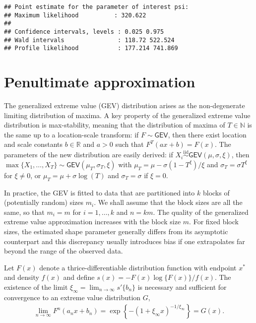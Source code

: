 \documentclass[]{book}
\begin{document}
\begin{verbatim}
## Point estimate for the parameter of interest psi:
## Maximum likelihood          : 320.622 
## 
## Confidence intervals, levels : 0.025 0.975 
## Wald intervals               : 118.72 522.524 
## Profile likelihood           : 177.214 741.869
\end{verbatim}

\hypertarget{penultimate-approximation}{%
\chapter{Penultimate approximation}\label{penultimate-approximation}}

The generalized extreme value (GEV) distribution arises as the non-degenerate limiting distribution of maxima. A key property of the generalized extreme value distribution is max-stability, meaning that the distribution of maxima of \(T \in \mathbb{N}\) is the same up to a location-scale transform: if \(F \sim \mathsf{GEV}\), then there exist location and scale constants \(b \in \mathbb{R}\) and \(a>0\) such that \(F^T(ax+b) = F(x)\). The parameters of the new distribution are easily derived: if \(X_i \stackrel{\mathrm{iid}}{\sim}\mathsf{GEV}(\mu,\sigma, \xi)\), then \(\max\{X_1, \ldots, X_T\} \sim \mathsf{GEV}(\mu_T, \sigma_T, \xi)\) with \(\mu_T = \mu - \sigma(1-T^\xi)/\xi\) and \(\sigma_T = \sigma T^\xi\) for \(\xi \neq 0\), or \(\mu_T = \mu +\sigma \log(T)\) and \(\sigma_T = \sigma\) if \(\xi=0\).

In practice, the GEV is fitted to data that are partitioned into \(k\) blocks of (potentially random) sizes \(m_i\). We shall assume that the block sizes are all the same, so that \(m_i=m\) for \(i=1,\ldots, k\) and \(n = km\). The quality of the generalized extreme value approximation increases with the block size \(m\). For fixed block sizes, the estimated shape parameter generally differs from its asymptotic counterpart and this discrepancy usually introduces bias if one extrapolates far beyond the range of the observed data.

Let \(F(x)\) denote a thrice-differentiable distribution function with endpoint \(x^*\) and density \(f(x)\) and define \(s(x)=-F(x)\log\{F(x)\}/f(x)\). The existence of the limit \(\xi_{\infty} = \lim_{n \to \infty} s'\{b_n\}\) is necessary and sufficient for convergence to an extreme value distribution \(G\),
\begin{align*}
 \lim_{n \to \infty} F^n(a_nx+b_n) = \exp\left\{-(1+\xi_\infty x)^{-1/\xi_\infty}\right\}=G(x).
\end{align*}
\end{document}
